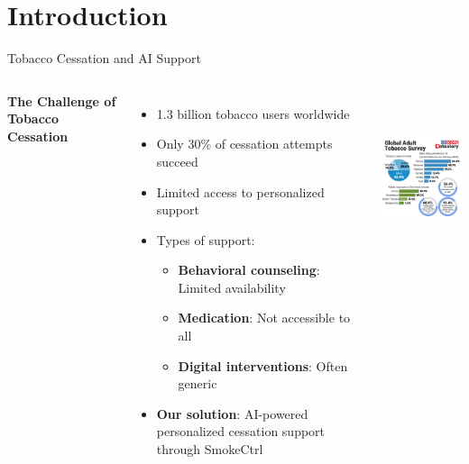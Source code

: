 \section{Introduction}

\begin{frame}{Tobacco Cessation and AI Support}
    \begin{columns}[c]
        \textbf{The Challenge of Tobacco Cessation}
        \begin{itemize}
            \item 1.3 billion tobacco users worldwide
            \item Only 30\% of cessation attempts succeed
            \item Limited access to personalized support
            \item Types of support:
            \begin{itemize}
                    \item \textbf{Behavioral counseling}: Limited availability
                    \item \textbf{Medication}: Not accessible to all
                    \item \textbf{Digital interventions}:     Often generic
        \end{itemize}
            \item \textbf{Our solution}: AI-powered personalized cessation support through SmokeCtrl
        \end{itemize}
        
        \includegraphics[width=0.75\linewidth, height=5cm]{presentation/images/Introduction/tobacco_stats.jpg}
    \end{columns}
\end{frame}

